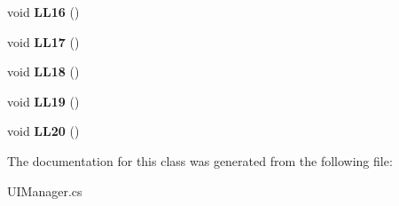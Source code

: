 \begin{DoxyCompactItemize}
\item 
\hypertarget{class_u_i_manager_a86fdc774bf62dbc915a1c89caa95df5b}{}void {\bfseries L\+L16} ()\label{class_u_i_manager_a86fdc774bf62dbc915a1c89caa95df5b}

\item 
\hypertarget{class_u_i_manager_a52414255908aa3b1a9a4d168ab7cc045}{}void {\bfseries L\+L17} ()\label{class_u_i_manager_a52414255908aa3b1a9a4d168ab7cc045}

\item 
\hypertarget{class_u_i_manager_a22c6a94f80a0335e8aa751d6a4ace70e}{}void {\bfseries L\+L18} ()\label{class_u_i_manager_a22c6a94f80a0335e8aa751d6a4ace70e}

\item 
\hypertarget{class_u_i_manager_af3855d169a017b3c749c2f7c93caa421}{}void {\bfseries L\+L19} ()\label{class_u_i_manager_af3855d169a017b3c749c2f7c93caa421}

\item 
\hypertarget{class_u_i_manager_ae53f4c5b2b5d9c82eac99f76921586d7}{}void {\bfseries L\+L20} ()\label{class_u_i_manager_ae53f4c5b2b5d9c82eac99f76921586d7}

\end{DoxyCompactItemize}


The documentation for this class was generated from the following file\+:\begin{DoxyCompactItemize}
\item 
U\+I\+Manager.\+cs\end{DoxyCompactItemize}
